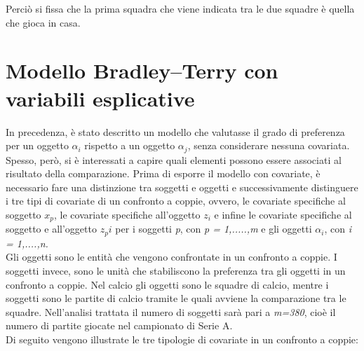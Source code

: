 Perciò si fissa che la prima squadra che viene indicata tra le due squadre è quella che gioca in casa.
\section{Modello Bradley–Terry con variabili esplicative}
In precedenza, è stato descritto un modello che valutasse il grado di preferenza per un oggetto $\alpha_{i}$ rispetto a un oggetto $\alpha_{j}$, senza considerare nessuna covariata. Spesso, però, si è interessati a capire quali elementi possono essere associati al risultato della comparazione. Prima di esporre il modello con covariate, è necessario fare una distinzione tra soggetti e oggetti e successivamente distinguere i tre tipi di covariate di un confronto a coppie, ovvero, le covariate specifiche al soggetto $x_p$, le covariate specifiche all'oggetto $z_i$ e infine le covariate specifiche al soggetto e all'oggetto $z_pi$ per i soggetti \emph{p}, con \emph{p = 1,.....,m} e gli oggetti $\alpha_{i}$, con \emph{i = 1,....,n.}\\
Gli oggetti sono le entità che vengono confrontate in un confronto a coppie. I soggetti invece, sono le unità che stabiliscono la preferenza tra gli oggetti in un confronto a coppie. Nel calcio gli oggetti sono le squadre di calcio, mentre i soggetti sono le partite di calcio tramite le quali avviene la comparazione tra le squadre. Nell'analisi trattata il numero di soggetti sarà pari a \emph{m=380}, cioè il numero di partite giocate nel campionato di Serie A.\\
Di seguito vengono illustrate le tre tipologie di covariate in un confronto a coppie:
